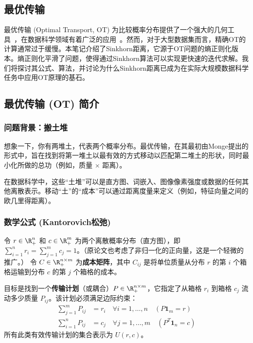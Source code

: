 \documentclass[lang=cn,newtx,10pt,scheme=chinese,chinesefont=nofont,citestyle=gb7714-2015, bibstyle=gb7714-2015]{elegantbook}
\begin{document}
\begin{refsection}
\chapter{最优传输}
最优传输 (Optimal Transport, OT) 为比较概率分布提供了一个强大的几何工具~\cite{villani2008optimal}，在数据科学领域有着广泛的应用~\cite{peyre2019computational}。然而，对于大型数据集而言，精确OT的计算通常过于缓慢。本笔记介绍了Sinkhorn距离，它源于OT问题的熵正则化版本。熵正则化平滑了问题，使得通过Sinkhorn算法可以实现更快速的迭代求解。我们将探讨其公式、算法，并讨论为什么Sinkhorn距离已成为在实际大规模数据科学任务中应用OT原理的基石。


\section{最优传输 (OT) 简介}

\subsection{问题背景：搬土堆}
想象一下，你有两堆土，代表两个概率分布。最优传输，在其最初由Monge提出的形式中，旨在找到将第一堆土以最有效的方式移动以匹配第二堆土的形状，同时最小化所做的总功（例如，质量 $\times$ 距离）。

在数据科学中，这些“土堆”可以是直方图、词嵌入、图像像素强度或数据的任何其他离散表示。移动“土”的“成本”可以通过距离度量来定义（例如，特征向量之间的欧几里得距离）。

\subsection{数学公式 (Kantorovich松弛)}
令 $r \in \R_+^n$ 和 $c \in \R_+^m$ 为两个离散概率分布（直方图），即 $\sum_{i=1}^n r_i = \sum_{j=1}^m c_j = 1$。（原论文也考虑了非归一化的正向量，这是一个轻微的推广。）
令 $C \in \R_+^{n \times m}$ 为\textbf{成本矩阵}，其中 $C_{ij}$ 是将单位质量从分布 $r$ 的第 $i$ 个箱格运输到分布 $c$ 的第 $j$ 个箱格的成本。

目标是找到一个\textbf{传输计划}（或耦合）$P \in \R_+^{n \times m}$，它指定了从箱格 $r_i$ 到箱格 $c_j$ 流动多少质量 $P_{ij}$。该计划必须满足边际约束：
\begin{align}
    \sum_{j=1}^m P_{ij} &= r_i \quad \forall i=1, \dots, n \quad (P\mathbf{1}_m = r) \\
    \sum_{i=1}^n P_{ij} &= c_j \quad \forall j=1, \dots, m \quad (P^T\mathbf{1}_n = c)
\end{align}
所有此类有效传输计划的集合表示为 $U(r,c)$。


\end{refsection}
\end{document}
